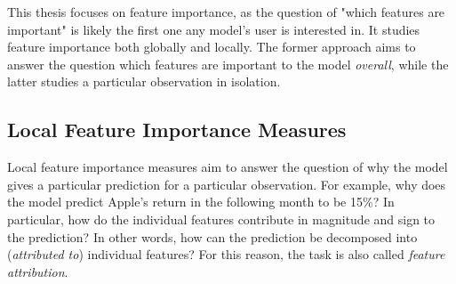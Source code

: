 		This thesis focuses on feature importance, as the question of "which features are important" is likely the first one any model's user is interested in. It studies feature importance both globally and locally. The former approach aims to answer the question which features are important to the model \textit{overall}, while the latter studies a particular observation in isolation.
		
		
		\subsection{Local Feature Importance Measures}
			Local feature importance measures aim to answer the question of why the model gives a particular prediction for a particular observation. For example, why does the model predict Apple's return in the following month to be 15\%? In particular, how do the individual features contribute in magnitude and sign to the prediction? In other words, how can the prediction be decomposed into (\textit{attributed to}) individual features? For this reason, the task is also called \textit{feature attribution}.  
			
